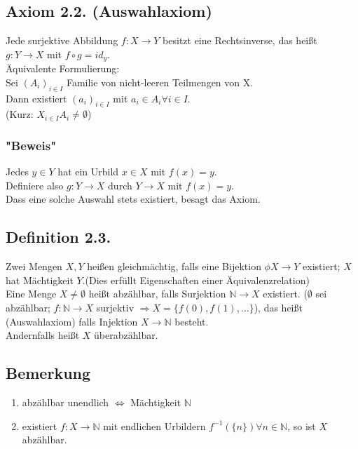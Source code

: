 \documentclass[a4paper, 12pt]{extarticle}
\begin{document}
\subsection*{Axiom 2.2. (Auswahlaxiom)}
Jede surjektive Abbildung $f: X \rightarrow Y$ besitzt eine Rechtsinverse, das heißt \\
$g: Y \rightarrow X$ mit $f \circ g = id_y$.\\
Äquivalente Formulierung:\\
Sei $(A_i)_{i \in I}$ Familie von nicht-leeren Teilmengen von X.\\
Dann existiert $(a_i)_{i \in I}$ mit $a_i \in A_i \forall i \in I$.\\
(Kurz: $X_{i \in I} A_i \neq \emptyset $)
\subsubsection*{"Beweis"}
Jedes $y \in Y$ hat ein Urbild $x \in X$ mit $f(x) = y$.\\
Definiere also $g: Y \rightarrow X$ durch $Y \rightarrow X$ mit $f(x) = y$.\\
Dass eine solche Auswahl stets existiert, besagt das Axiom.

\subsection*{Definition 2.3.}
Zwei Mengen $X,Y$ heißen gleichmächtig, falls eine Bijektion $\phi X \rightarrow Y$ existiert; $X$ hat Mächtigkeit $Y$.(Dies erfüllt Eigenschaften einer Äquivalenzrelation)\\
Eine Menge $X \neq \emptyset$ heißt abzählbar, falls Surjektion $\mathbb{N} \rightarrow X$ existiert. ($\emptyset$ sei abzählbar; $f: \mathbb{N} \rightarrow X$ surjektiv $\Rightarrow X = \{f(0), f(1), ...\}$), das heißt (Auswahlaxiom) falls  Injektion $X \rightarrow \mathbb{N}$ besteht.\\
Andernfalls heißt $X$ überabzählbar.

\subsection*{Bemerkung}
\begin{enumerate}[label=(\arabic*)]
\item abzählbar unendlich  $\Leftrightarrow$ Mächtigkeit $\mathbb{N}$
\item existiert $f: X \rightarrow \mathbb{N}$ mit endlichen Urbildern $f^{-1}(\{n\}) \forall n\in \mathbb{N}$, so ist $X$ abzählbar.
\end{enumerate}
\end{document}
